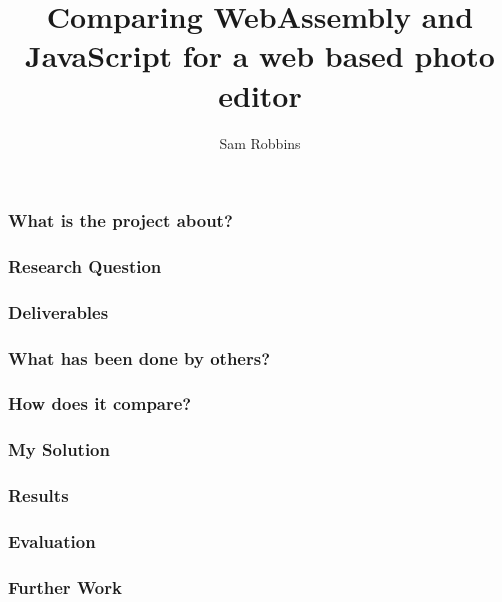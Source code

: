 \documentclass{beamer}
\title{Comparing WebAssembly and JavaScript for a web based photo editor}
\author{Sam Robbins}
\institute{Durham University}
\date{}
\begin{document}
\frame{\titlepage}

\begin{frame}
    \frametitle{What is the project about?}
\end{frame}

\begin{frame}
    \frametitle{Research Question}
\end{frame}

\begin{frame}
    \frametitle{Deliverables}
\end{frame}

\begin{frame}
    \frametitle{What has been done by others?}
\end{frame}

\begin{frame}
    \frametitle{How does it compare?}
\end{frame}

\begin{frame}
    \frametitle{My Solution}
\end{frame}

\begin{frame}
    \frametitle{Results}
\end{frame}

\begin{frame}
    \frametitle{Evaluation}
\end{frame}

\begin{frame}
    \frametitle{Further Work}
\end{frame}
\end{document}
